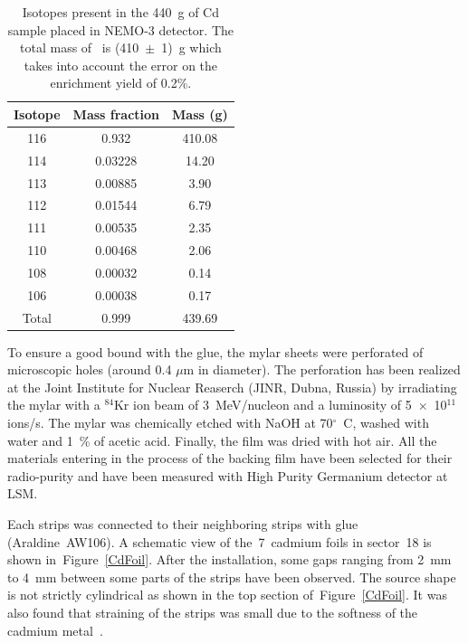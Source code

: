 \documentclass[main.tex]{subfiles}
\begin{document}
\begin{table}[h!]
\begin{center}
\begin{tabular}{c|c|c}
\toprule
Isotope & Mass fraction & Mass (g) \\
\midrule
116   & 0.932   & 410.08 \\[0.05cm]
114   & 0.03228 & 14.20  \\[0.05cm]
113   & 0.00885 & 3.90   \\[0.05cm]
112   & 0.01544 & 6.79   \\[0.05cm]
111   & 0.00535 & 2.35   \\[0.05cm]
110   & 0.00468 & 2.06   \\[0.05cm]
108   & 0.00032 & 0.14   \\[0.05cm]
106   & 0.00038 & 0.17   \\[0.05cm]
Total & 0.999   & 439.69 \\[0.05cm]
\bottomrule
\end{tabular}
\end{center}
\label{IsotopeCdTable}
\caption{Isotopes present in the 440~g of Cd sample placed in NEMO-3 detector. The total mass of \Cd~is (410~$\pm$~1)~g which takes into account the error on the enrichment yield of 0.2\%.}
\end{table}


\bigskip


\NI To ensure a good bound with the glue, the mylar sheets were perforated of microscopic holes (around 0.4 $\mu$m in diameter). The perforation has been realized at the Joint Institute for Nuclear Reaserch (JINR, Dubna, Russia) by irradiating the mylar with a $^{\text{84}}$Kr ion beam of 3~MeV/nucleon and a luminosity of 5~$\times$~10$^{\text{11}}$ ions/s. The mylar was chemically etched with NaOH at 70$^{\circ}$~C, washed with water and 1~\% of acetic acid. Finally, the film was dried with hot air. All the materials entering in the process of the backing film have been selected for their radio-purity and have been measured with High Purity Germanium detector at LSM.


\bigskip


\NI Each strips was connected to their neighboring strips with glue (Araldine~AW106). A schematic view of the~7~cadmium foils in sector~18 is shown in~Figure~\ref{CdFoil}. After the installation, some gaps ranging from 2~mm to 4~mm between some parts of the strips have been observed. The source shape is not strictly cylindrical as shown in the top section of~Figure~\ref{CdFoil}. It was also found that straining of the strips was small due to the softness of the cadmium metal~\cite{SoftnessCdMetal}. 
\end{document}
